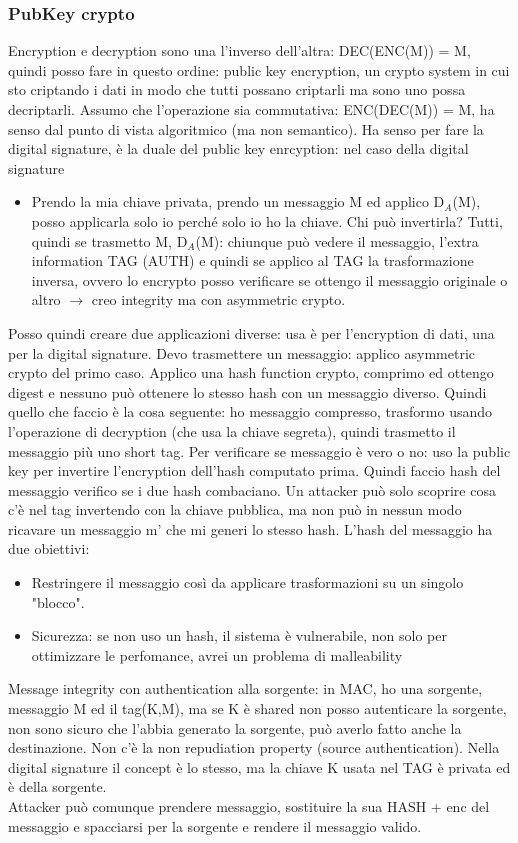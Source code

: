 \documentclass[16px]{article}
\begin{document}
\subsubsection{PubKey crypto}
Encryption e decryption sono una l'inverso dell'altra: DEC(ENC(M)) = M, quindi posso fare in questo ordine: public key encryption, un crypto system in cui sto criptando i dati in modo che tutti possano criptarli ma sono uno possa decriptarli. Assumo che l'operazione sia commutativa: ENC(DEC(M)) = M, ha senso dal punto di vista algoritmico (ma non semantico). Ha senso per fare la digital signature, è la duale del public key enrcyption: nel caso della digital signature
\begin{itemize}
\item Prendo la mia chiave privata, prendo un messaggio M ed applico D$_{A}$(M), posso applicarla solo io perché solo io ho la chiave. Chi può invertirla? Tutti, quindi se trasmetto M, D$_{A}$(M): chiunque può vedere il messaggio, l'extra information TAG (AUTH) e quindi se applico al TAG la trasformazione inversa, ovvero lo encrypto posso verificare se ottengo il messaggio originale o altro $\rightarrow$ creo integrity ma con asymmetric crypto.
\end{itemize}
Posso quindi creare due applicazioni diverse: usa è per l'encryption di dati, una per la digital signature. Devo trasmettere un messaggio: applico asymmetric crypto del primo caso. Applico una hash function crypto, comprimo ed ottengo digest e nessuno può ottenere lo stesso hash con un messaggio diverso. Quindi quello che faccio è la cosa seguente: ho messaggio compresso, trasformo usando l'operazione di decryption (che usa la chiave segreta), quindi trasmetto il messaggio più uno short tag. Per verificare se messaggio è vero o no: uso la public key per invertire l'encryption dell'hash computato prima. Quindi faccio hash del messaggio verifico se i due hash combaciano. Un attacker può solo scoprire cosa c'è nel tag invertendo con la chiave pubblica, ma non può in nessun modo ricavare un messaggio m' che mi generi lo stesso hash. L'hash del messaggio ha due obiettivi:
\begin{itemize}
\item Restringere il messaggio così da applicare trasformazioni su un singolo "blocco".
\item Sicurezza: se non uso un hash, il sistema è vulnerabile, non solo per ottimizzare le perfomance, avrei un problema di malleability
\end{itemize}
Message integrity con authentication alla sorgente: in MAC, ho una sorgente, messaggio M ed il tag(K,M), ma se K è shared non posso autenticare la sorgente, non sono sicuro che l'abbia generato la sorgente, può averlo fatto anche la destinazione. Non c'è la non repudiation property (source authentication). Nella digital signature il concept è lo stesso, ma la chiave K usata nel TAG è privata ed è della sorgente.\\ Attacker può comunque prendere messaggio, sostituire la sua HASH + enc del messaggio e spacciarsi per la sorgente e rendere il messaggio valido.
\end{document}
